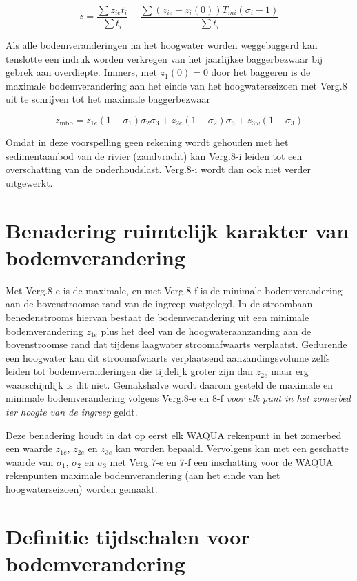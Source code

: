 \begin{equation}
\bar{z} = \frac{\sum{z_{ie} t_i}}{\sum{t_i}} + \frac{\sum{(z_{ie}-z_i(0)) T_{mi} (\sigma_i-1)}}{\sum{t_i}}
\end{equation}

Als alle bodemveranderingen na het hoogwater worden weggebaggerd kan tenslotte een indruk worden verkregen van het jaarlijkse baggerbezwaar bij gebrek aan overdiepte.
Immers, met $z_1(0)=0$ door het baggeren is de maximale bodemverandering aan het einde van het hoogwaterseizoen met Verg.8 uit te schrijven tot het maximale baggerbezwaar

\begin{equation}
z_\text{mbb} = z_{1e}(1-\sigma_1) \sigma_2 \sigma_3 + z_{2e} (1-\sigma_2) \sigma_3 + z_{3w} (1-\sigma_3)
\end{equation}

Omdat in deze voorspelling geen rekening wordt gehouden met het sedimentaanbod van de rivier (zandvracht) kan Verg.8-i leiden tot een overschatting van de onderhoudslast.
Verg.8-i wordt dan ook niet verder uitgewerkt.

\section{Benadering ruimtelijk karakter van bodemverandering}

Met Verg.8-e is de maximale, en met Verg.8-f is de minimale bodemverandering aan de bovenstroomse rand van de ingreep vastgelegd.
In de stroombaan benedenstrooms hiervan bestaat de bodemverandering uit een minimale bodemverandering $z_{1e}$ plus het deel van de hoogwateraanzanding aan de bovenstroomse rand dat tijdens laagwater stroomafwaarts verplaatst.
Gedurende een hoogwater kan dit stroomafwaarts verplaatsend aanzandingsvolume zelfs leiden tot bodemveranderingen die tijdelijk groter
zijn dan $z_{2e}$ maar erg waarschijnlijk is dit niet.
Gemakshalve wordt daarom gesteld de maximale en minimale bodemverandering volgens Verg.8-e en 8-f \emph{voor elk punt in het zomerbed ter hoogte van de ingreep} geldt.

Deze benadering houdt in dat op eerst elk WAQUA rekenpunt in het zomerbed een waarde $z_{1e}$, $z_{2e}$ en $z_{3e}$ kan worden bepaald.
Vervolgens kan met een geschatte waarde van $\sigma_1$, $\sigma_2$ en $\sigma_3$ met Verg.7-e en 7-f een inschatting voor de WAQUA rekenpunten maximale bodemverandering (aan het einde van het hoogwaterseizoen) worden gemaakt.

\section{Definitie tijdschalen voor bodemverandering}

